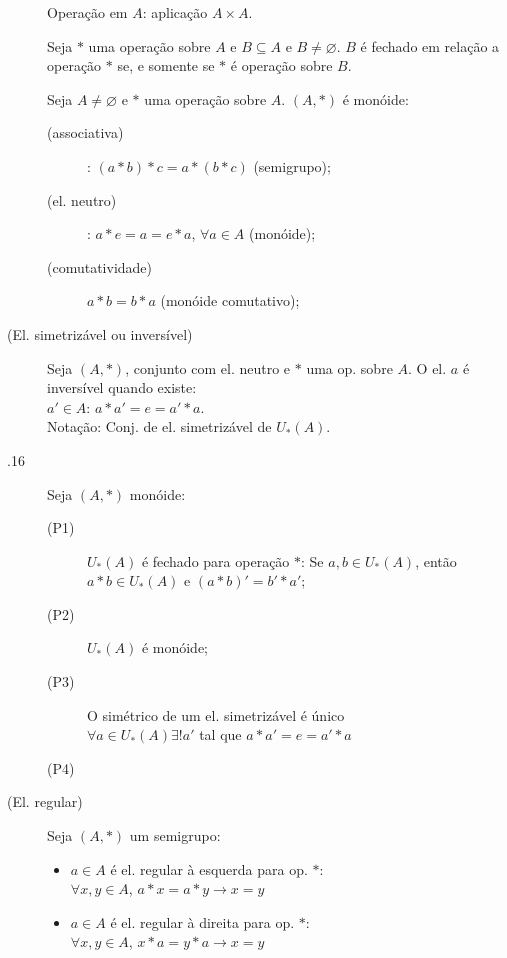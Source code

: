 \documentclass[11pt]{article}
\begin{document}
\begin{description}
  \item[] Operação em $A$: aplicação $A \times A$.
  \item[] Seja $*$ uma operação sobre $A$ e $B \subseteq A$ e $B \neq
    \varnothing$. $B$ é fechado em relação a operação $*$ se, e somente se $*$ é
    operação sobre $B$.
  \item[] Seja $A \neq \varnothing$ e $*$ uma operação sobre $A$. $(A, *)$ é
    monóide:
    \begin{description}
      \item[(associativa)]: $(a*b)*c = a*(b*c)$ (semigrupo);
      \item[(el. neutro)]: $a*e=a=e*a$, $\forall a \in A$ (monóide);
      \item[(comutatividade)] $a*b=b*a$ (monóide comutativo);
    \end{description}
  \item[ (El. simetrizável ou inversível)] Seja $(A, *)$, conjunto com
    el. neutro e $*$ uma op. sobre $A$. O el. $a$ é inversível quando
    existe: \\
    $a' \in A$: $a*a' = e = a' * a$. \\
    Notação: Conj. de el. simetrizável de $U_* (A)$.
  \item[.16] Seja $(A, *)$ monóide:
    \begin{description}
      \item[(P1)] $U_* (A)$ é fechado para operação $*$: Se $a,b \in U_* (A)$,
        então $a*b \in U_* (A)$ e $(a*b)' = b' * a'$;
      \item[(P2)] $U_* (A)$ é monóide;
      \item[(P3)] O simétrico de um el. simetrizável é único \\
        $\forall a \in U_* (A) \exists !a'$ tal que $a*a' = e = a' *a$
      \item[(P4)]
    \end{description}
  \item[ (El. regular)] Seja $(A, *)$ um semigrupo:
    \begin{itemize}
      \item $a \in A$ é el. regular à esquerda para op. $*$: \\
        $\forall x,y \in A$, $a*x = a*y \to x=y$
      \item $a \in A$ é el. regular à direita para op. $*$: \\
        $\forall x,y \in A$, $x*a = y*a \to x=y$
    \end{itemize}
\end{description}
\end{document}
